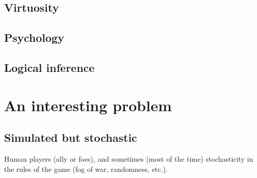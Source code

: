 \subsection{Virtuosity}
\subsection{Psychology}
\subsection{Logical inference}

\section{An interesting problem}
\subsection{Simulated but stochastic}
Human players (ally or foes), and sometimes (most of the time) stochasticity in the rules of the game (fog of war, randomness, etc.).
